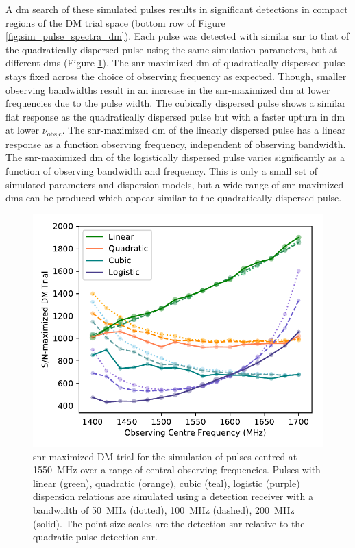 \documentclass[a4paper,fleqn,usenatbib]{mnras}
\begin{document}
A \gls{dm} search of these simulated pulses results in significant detections in
compact regions of the DM trial space (bottom row of Figure
\ref{fig:sim_pulse_spectra_dm}). Each pulse was detected with similar \gls{snr}
to that of the quadratically dispersed pulse using the same simulation
parameters, but at different \glspl{dm} (Figure \ref{fig:sim_snr_max_dm}). The
\gls{snr}-maximized \gls{dm} of quadratically dispersed pulse stays fixed across
the choice of observing frequency as expected. Though, smaller observing
bandwidths result in an increase in the \gls{snr}-maximized \gls{dm} at lower
frequencies due to the pulse width. The cubically dispersed pulse shows a
similar flat response as the quadratically dispersed pulse but with a faster
upturn in \gls{dm} at lower $\nu_{\textrm{obs,c}}$.  The \gls{snr}-maximized
\gls{dm} of the linearly dispersed pulse has a linear response as a function
observing frequency, independent of observing bandwidth.  The
\gls{snr}-maximized \gls{dm} of the logistically dispersed pulse varies
significantly as a function of observing bandwidth and frequency. This is only a
small set of simulated parameters and dispersion models, but a wide range of
\gls{snr}-maximized \glspl{dm} can be produced which appear similar to the
quadratically dispersed pulse.

\begin{figure}
    \includegraphics[width=1.0\linewidth]{figures/simulatedPulseDM.pdf}
    \caption{\gls{snr}-maximized DM trial for the simulation of pulses centred
    at 1550~MHz over a range of central observing frequencies. Pulses with
    linear (green), quadratic (orange), cubic (teal), logistic (purple)
    dispersion relations are simulated using a detection receiver with a
    bandwidth of 50~MHz (dotted), 100~MHz (dashed), 200~MHz (solid). The point
    size scales are the detection \gls{snr} relative to the quadratic pulse
    detection \gls{snr}.
    }
    \label{fig:sim_snr_max_dm}
\end{figure}
\end{document}
